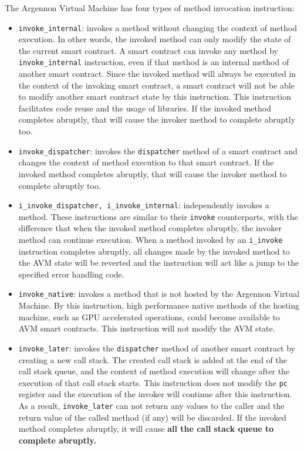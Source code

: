 The Argennon Virtual Machine has four types of method invocation instruction:
\begin{itemize}
    \item \texttt{invoke\_internal}: invokes a method without changing the context of method execution. In other
    words, the invoked method can only modify the state of the current smart contract.
    A smart contract can invoke any method by \texttt{invoke\_internal} instruction, even if that method is an
    internal method of another smart contract. Since the invoked method will always be executed in the context of
    the invoking smart contract, a smart contract will not be able to modify another smart contract state by
    this instruction. This instruction facilitates code reuse and the usage of libraries.
    If the invoked method completes abruptly, that will cause the invoker method to complete abruptly too.
    \item \texttt{invoke\_dispatcher}: invokes the \texttt{dispatcher} method of a smart contract and changes the
    context of method execution to that
    smart contract. If the invoked method completes abruptly, that will cause the invoker method to complete
    abruptly too.
    \item \texttt{i\_invoke\_dispatcher, i\_invoke\_internal}: independently invokes a method. These instructions
    are similar to their \texttt{invoke} counterparts, with the difference that when
    the invoked method completes abruptly, the invoker method can continue execution. When a method invoked by
    an \texttt{i\_invoke} instruction completes abruptly, all changes made
    by the invoked method to the AVM state will be reverted and the instruction will act like
    a jump to the specified error handling code.
    \item \texttt{invoke\_native}: invokes a method that is not hosted by the Argennon Virtual Machine. By this
    instruction, high performance native methods of the hosting machine, such as GPU accelerated operations,
    could become available to AVM smart contracts. This instruction will not modify the AVM state.
    \item \texttt{invoke\_later}: invokes the \texttt{dispatcher} method of another smart contract by creating a new
    call stack. The created call stack is added at the end of the call stack queue, and
    the context of method execution will change after the execution of that call stack starts. This instruction does
    not modify the \texttt{pc} register and the execution of the
    invoker will continue after this instruction. As a result, \texttt{invoke\_later} can not return
    any values to the caller and the return value of the called method (if any) will be discarded. If the invoked
    method completes abruptly, it will cause \textbf{all the call stack queue to
    complete abruptly.}
\end{itemize}

